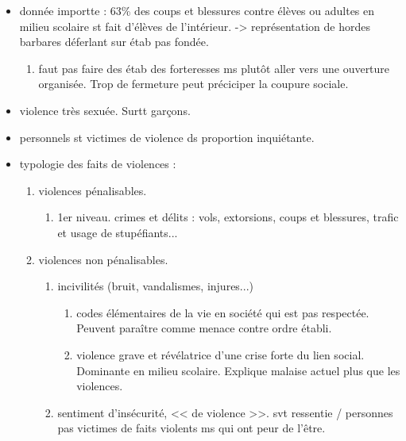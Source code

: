 \documentclass[12pt]{article}
\begin{document}
\begin{itemize}
\item donnée importte :  63\% des coups et blessures contre élèves ou adultes en milieu scolaire st fait d'élèves de l'intérieur. -> représentation de hordes barbares déferlant sur étab pas fondée.\\
\begin{enumerate}
\item faut pas faire des étab des forteresses ms plutôt aller vers une ouverture organisée. Trop de fermeture peut préciciper la coupure sociale.\\
\end{enumerate}

\item violence très sexuée. Surtt garçons.\\

\item  personnels st victimes de violence ds proportion inquiétante.\\

\item typologie des faits de violences : 
\begin{enumerate}
\item violences pénalisables.
\begin{enumerate}
\item 1er niveau. crimes et délits : vols, extorsions, coups et blessures, trafic et usage de stupéfiants...\\
\end{enumerate}
\item violences non pénalisables.
\begin{enumerate}
\item incivilités (bruit, vandalismes, injures...)
\begin{enumerate}
\item codes élémentaires de la vie en société qui est pas respectée. Peuvent paraître comme menace contre ordre établi. \\
\item violence grave et révélatrice d'une crise forte du lien social. Dominante en milieu scolaire. Explique malaise actuel plus que les violences.\\
\end{enumerate}

\item sentiment d'insécurité, << de violence >>. svt ressentie / personnes pas victimes de faits violents ms qui ont peur de l'être.\\


\end{enumerate}
\end{enumerate}
\end{itemize}
\end{document}
